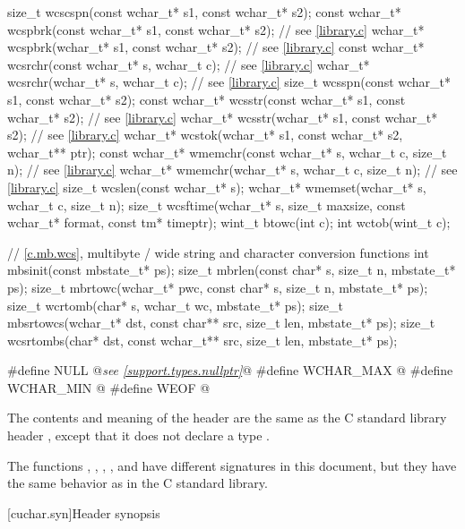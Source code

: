 \begin{codeblock}
{  size_t wcscspn(const wchar_t* s1, const wchar_t* s2);
  const wchar_t* wcspbrk(const wchar_t* s1, const wchar_t* s2); // see \ref{library.c}
  wchar_t* wcspbrk(wchar_t* s1, const wchar_t* s2);             // see \ref{library.c}
  const wchar_t* wcsrchr(const wchar_t* s, wchar_t c);          // see \ref{library.c}
  wchar_t* wcsrchr(wchar_t* s, wchar_t c);                      // see \ref{library.c}
  size_t wcsspn(const wchar_t* s1, const wchar_t* s2);
  const wchar_t* wcsstr(const wchar_t* s1, const wchar_t* s2);  // see \ref{library.c}
  wchar_t* wcsstr(wchar_t* s1, const wchar_t* s2);              // see \ref{library.c}
  wchar_t* wcstok(wchar_t* s1, const wchar_t* s2, wchar_t** ptr);
  const wchar_t* wmemchr(const wchar_t* s, wchar_t c, size_t n);    // see \ref{library.c}
  wchar_t* wmemchr(wchar_t* s, wchar_t c, size_t n);            // see \ref{library.c}
  size_t wcslen(const wchar_t* s);
  wchar_t* wmemset(wchar_t* s, wchar_t c, size_t n);
  size_t wcsftime(wchar_t* s, size_t maxsize, const wchar_t* format, const tm* timeptr);
  wint_t btowc(int c);
  int wctob(wint_t c);

  // \ref{c.mb.wcs}, multibyte / wide string and character conversion functions
  int mbsinit(const mbstate_t* ps);
  size_t mbrlen(const char* s, size_t n, mbstate_t* ps);
  size_t mbrtowc(wchar_t* pwc, const char* s, size_t n, mbstate_t* ps);
  size_t wcrtomb(char* s, wchar_t wc, mbstate_t* ps);
  size_t mbsrtowcs(wchar_t* dst, const char** src, size_t len, mbstate_t* ps);
  size_t wcsrtombs(char* dst, const wchar_t** src, size_t len, mbstate_t* ps);
}

#define NULL @\textit{see \ref{support.types.nullptr}}@
#define WCHAR_MAX @\seebelow@
#define WCHAR_MIN @\seebelow@
#define WEOF @\seebelow@
\end{codeblock}

\pnum
The contents and meaning of the header 
are the same as the C standard library header
, except that it does not declare a type .

\pnum
\begin{note}
The functions
, , , , and 
have different signatures in this document,
but they have the same behavior as in the C standard library.
\end{note}


[cuchar.syn]{Header  synopsis}

